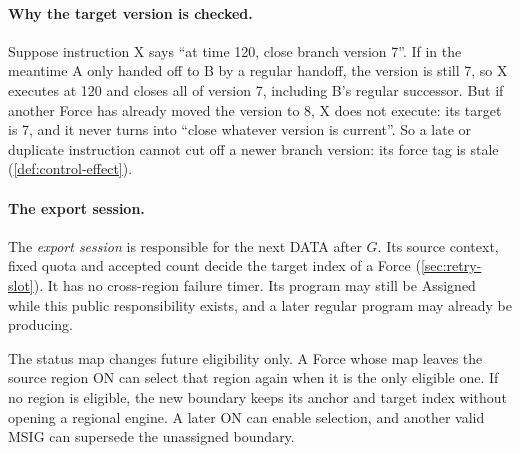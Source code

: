 \documentclass[11pt,a4paper]{article}
\newcommand{\defterm}[1]{\textcolor{rrBlue}{\textit{#1}}}
\begin{document}
\paragraph{Why the target version is checked.}
Suppose instruction X says ``at time 120, close branch version 7''. If
in the meantime A only handed off to B by a regular handoff, the version
is still 7, so X executes at 120 and closes all of version 7, including
B's regular successor. But if another Force has already moved the
version to 8, X does not execute: its target is 7, and it never turns
into ``close whatever version is current''. So a late or duplicate
instruction cannot cut off a newer branch version: its force tag is
stale (\cref{def:control-effect}).

\paragraph{The export session.}
The \defterm{export session} is responsible for the next DATA after $G$.
Its source context, fixed quota and accepted count decide the target
index of a Force (\cref{sec:retry-slot}). It has no cross-region failure
timer. Its program may still be Assigned while this public responsibility
exists, and a later regular program may already be producing.

The status map changes future eligibility only. A Force whose map
leaves the source region ON can select that region again when it is the
only eligible one. If no region
is eligible, the new boundary keeps its anchor and target index without
opening a regional engine. A later ON can enable selection, and another
valid MSIG can supersede the unassigned boundary.
\end{document}
